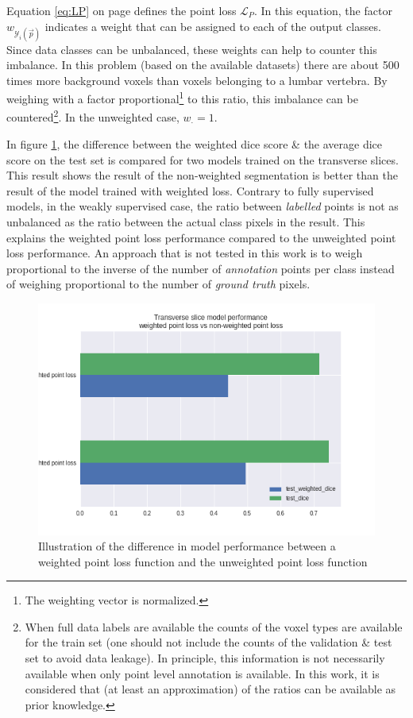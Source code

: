 \par{
    Equation \ref{eq:LP} on page \pageref{eq:LP} defines the point loss $\mathcal{L}_P$. 
    In this equation, the factor $w_{\mathcal{Y}_i(\vec{p})}$ indicates a weight that can be assigned to each of the output classes.
    Since data classes can be unbalanced, these weights can help to counter this imbalance.
    In this problem (based on the available datasets) there are about 500 times more background voxels than voxels belonging to a lumbar vertebra.
    By weighing with a factor proportional\footnote{The weighting vector is normalized.} to this ratio, this imbalance can be countered\footnote{
        When full data labels are available the counts of the voxel types are available for the train set (one should not include the counts of the validation \& test set to avoid data leakage).
        In principle, this information is not necessarily available when only point level annotation is available. In this work, it is considered that (at least an approximation) of the ratios can be available as prior knowledge.
    }. In the unweighted case, $w_{\cdot} = 1$.
}
\par{
    In figure \ref{fig:weighted_vs_unweighted}, the difference between the weighted dice score \& the average dice score on the test set is compared for two models trained on the transverse slices.
    This result shows the result of the non-weighted segmentation is better than the result of the model trained with weighted loss.
    Contrary to fully supervised models, in the weakly supervised case, the ratio between \textit{labelled} points is not as unbalanced as the ratio between the actual class pixels in the result.
    This explains the weighted point loss performance compared to the unweighted point loss performance.
    An approach that is not tested in this work is to weigh proportional to the inverse of the number of \textit{annotation} points per class instead of weighing proportional to the number of \textit{ground truth} pixels.
}

\begin{figure}
    \centering
    \includegraphics[width=.95\textwidth]{images/TransverseModel_weightedvsnonweighted.png}
    \caption{Illustration of the difference in model performance between a weighted point loss function and the unweighted point loss function\label{fig:weighted_vs_unweighted}}
\end{figure}

